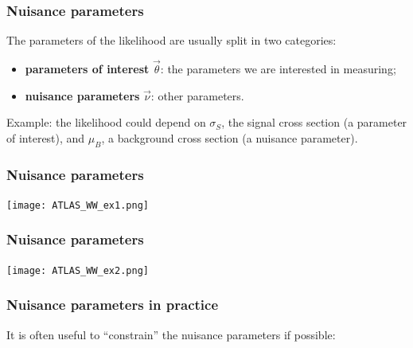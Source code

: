 \documentclass[9pt]{beamer}
\begin{document}
\begin{frame}
 \frametitle{Nuisance parameters}
 
 The parameters of the likelihood are usually split in two categories:
 
 \begin{itemize}
  \item \textbf{parameters of interest} $\vec{\theta}$: the parameters we are interested in measuring;
  \item \textbf{nuisance parameters} $\vec{\nu}$: other parameters.
 \end{itemize}
 
 Example: the likelihood could depend on $\sigma_S$, the signal cross section (a parameter of interest), and $\mu_B$, a background cross section (a nuisance parameter).

\end{frame}

\begin{frame}
 \frametitle{Nuisance parameters}
 
 \centering
 \texttt{[image: ATLAS\_WW\_ex1.png]}
\end{frame}

\begin{frame}
 \frametitle{Nuisance parameters}
 
 \centering
 \texttt{[image: ATLAS\_WW\_ex2.png]}
\end{frame}

\begin{frame}
 \frametitle{Nuisance parameters in practice}
 
 It is often useful to ``constrain'' the nuisance parameters if possible:
 
 
\end{frame}
\end{document}
